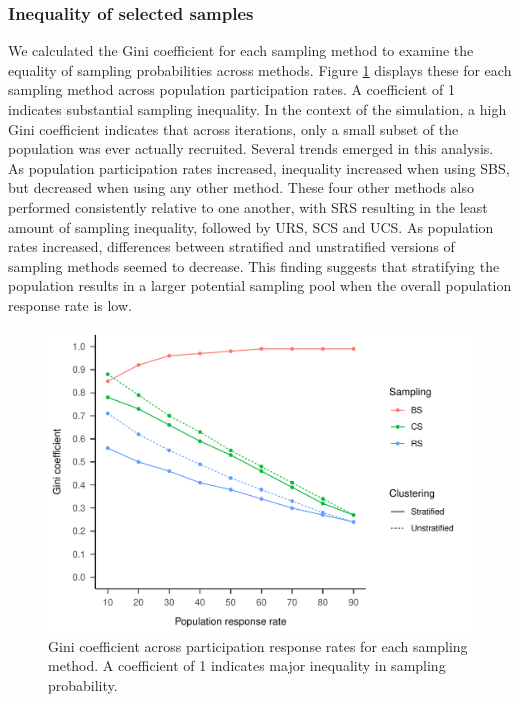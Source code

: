 \documentclass[
  english,
  man,floatsintext]{apa6}
\begin{document}
\hypertarget{inequality-of-selected-samples}{%
\subsubsection{Inequality of selected samples}\label{inequality-of-selected-samples}}

We calculated the Gini coefficient for each sampling method to examine the equality of sampling probabilities across methods. Figure \ref{fig:fig-gini} displays these for each sampling method across population participation rates. A coefficient of 1 indicates substantial sampling inequality. In the context of the simulation, a high Gini coefficient indicates that across iterations, only a small subset of the population was ever actually recruited.
Several trends emerged in this analysis. As population participation rates increased, inequality increased when using SBS, but decreased when using any other method. These four other methods also performed consistently relative to one another, with SRS resulting in the least amount of sampling inequality, followed by URS, SCS and UCS. As population rates increased, differences between stratified and unstratified versions of sampling methods seemed to decrease. This finding suggests that stratifying the population results in a larger potential sampling pool when the overall population response rate is low.

\begin{figure}
\centering
\includegraphics{GenSamp-Paper_files/figure-latex/fig-gini-1.pdf}
\caption{\label{fig:fig-gini}Gini coefficient across participation response rates for each sampling method. A coefficient of 1 indicates major inequality in sampling probability.}
\end{figure}
\end{document}
